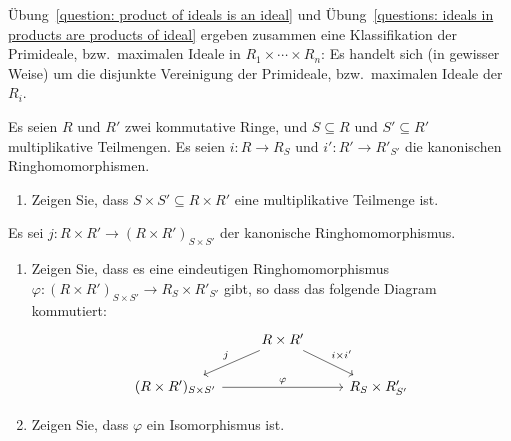 \begin{remark*}
  Übung~\ref{question: product of ideals is an ideal} und Übung~\ref{questions: ideals in products are products of ideal} ergeben zusammen eine Klassifikation der Primideale, bzw.\ maximalen Ideale in $R_1 \times \dotsb \times R_n$:
  Es handelt sich (in gewisser Weise) um die disjunkte Vereinigung der Primideale, bzw.\ maximalen Ideale der $R_i$.
\end{remark*}


\begin{question}[subtitle = Lokalisierung und Produkte]
  Es seien $R$ und $R'$ zwei kommutative Ringe, und $S \subseteq R$ und $S' \subseteq R'$ multiplikative Teilmengen.
  Es seien $i \colon R \to R_S$ und $i' \colon R' \to R'_{S'}$ die kanonischen Ringhomomorphismen.
  \begin{enumerate}
    \item
      Zeigen Sie, dass $S \times S' \subseteq R \times R'$ eine multiplikative Teilmenge ist.
  \end{enumerate}
  Es sei $j \colon R \times R' \to (R \times R')_{S \times S'}$ der kanonische Ringhomomorphismus.
  \begin{enumerate}[resume]
    \item
      Zeigen Sie, dass es eine eindeutigen Ringhomomorphismus $\varphi \colon (R \times R')_{S \times S'} \to R_S \times R'_{S'}$ gibt, so dass das folgende Diagram kommutiert:
      \[
        \begin{tikzcd}[ampersand replacement = \&]
              {}
          \&  R \times R'
              \arrow{dl}[swap]{j}
              \arrow{dr}{i \times i'}
              {}
          \\
              (R \times R')_{S \times S'}
              \arrow{rr}{\varphi}
          \&  {}
          \&  R_S \times R'_{S'}
        \end{tikzcd}
      \]
    \item
      Zeigen Sie, dass $\varphi$ ein Isomorphismus ist.
  \end{enumerate}
\end{question}


